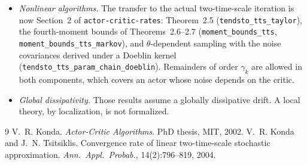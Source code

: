 \documentclass[11pt]{article}
\theoremstyle{definition}
\theoremstyle{remark}
\begin{document}
\begin{itemize}
\item \emph{Nonlinear algorithms.} The transfer to the actual two-time-scale iteration is now
  Section~2 of \texttt{actor-critic-rates}: Theorem~2.5 (\texttt{tendsto\_tts\_taylor}), the fourth-moment
  bounds of Theorems~2.6--2.7 (\texttt{moment\_bounds\_tts}, \texttt{moment\_bounds\_tts\_markov}), and
  $\theta$-dependent sampling with the noise covariances derived under a Doeblin kernel
  (\texttt{tendsto\_tts\_param\_chain\_doeblin}). Remainders of order $\gamma_k$ are allowed in both
  components, which covers an actor whose noise depends on the critic.
\item \emph{Global dissipativity.} Those results assume a globally dissipative drift. A local
  theory, by localization, is not formalized.
\end{itemize}

\begin{thebibliography}{9}
 V.~R. Konda. \emph{Actor-Critic Algorithms}. PhD thesis, MIT, 2002.
 V.~R. Konda and J.~N. Tsitsiklis. Convergence rate of linear
  two-time-scale stochastic approximation. \emph{Ann.\ Appl.\ Probab.}, 14(2):796--819, 2004.
\end{thebibliography}
\end{document}

